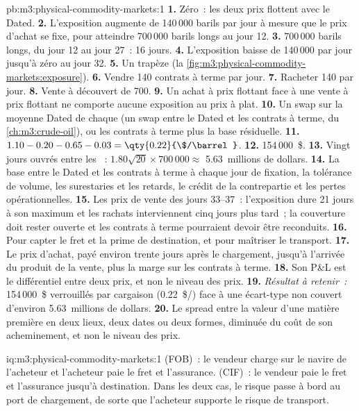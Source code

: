 \begin{solution}{pb:m3:physical-commodity-markets:1}
\textbf{1.} Zéro~: les deux prix flottent avec le Dated. \textbf{2.} L'exposition augmente de 140\,000
barils par jour à mesure que le prix d'achat se fixe, pour atteindre 700\,000 barils longs au jour 12. \textbf{3.}
700\,000 barils longs, du jour 12 au jour 27~: 16 jours. \textbf{4.} L'exposition baisse de
140\,000 par jour jusqu'à zéro au jour 32. \textbf{5.} Un trapèze
(la \cref{fig:m3:physical-commodity-markets:exposure}).
\textbf{6.} Vendre 140 contrats à terme par jour. \textbf{7.} Racheter 140 par jour.
\textbf{8.} Vente à découvert de 700. \textbf{9.} Un achat à prix flottant face à une vente à prix flottant ne
comporte aucune exposition au prix à plat. \textbf{10.} Un swap sur la moyenne Dated de chaque
 (un swap entre le Dated et les contrats à terme, du \cref{ch:m3:crude-oil}), ou les contrats à terme plus la
base résiduelle.
\textbf{11.} $1.10 - 0.20 - 0.65 - 0.03 = \qty{0.22}{\$/\barrel}$. \textbf{12.}
154\,000~\$. \textbf{13.} Vingt jours ouvrés entre les ~:
$1.80\sqrt{20} \times 700\,000 \approx$ 5.63~millions de dollars. \textbf{14.} La base
entre le Dated et les contrats à terme à chaque jour de fixation, la tolérance de volume, les surestaries et
les retards, le crédit de la contrepartie et les pertes opérationnelles. \textbf{15.} Les prix de vente
des jours 33--37~: l'exposition dure 21 jours à son maximum et les rachats interviennent cinq
jours plus tard~; la couverture doit rester ouverte et les contrats à terme pourraient devoir être reconduits.
\textbf{16.} Pour capter le fret et la prime de destination, et pour maîtriser le
transport. \textbf{17.} Le prix d'achat, payé environ trente jours après le chargement,
jusqu'à l'arrivée du produit de la vente, plus la marge sur les contrats à terme. \textbf{18.} Son P\&L
est le différentiel entre deux prix, et non le niveau des prix. \textbf{19.}
\emph{Résultat à retenir~:} 154\,000~\$ verrouillés par cargaison (\qty{0.22}{\$/\barrel}) face à une
écart-type non couvert d'environ 5.63~millions de dollars. \textbf{20.} Le spread
entre la valeur d'une matière première en deux lieux, deux dates ou deux formes, diminuée du coût de
son acheminement, et non le niveau des prix.
\end{solution}

\begin{solution}{iq:m3:physical-commodity-markets:1}
 (FOB)~: le vendeur charge sur le navire de l'acheteur et l'acheteur paie le fret et
l'assurance.  (CIF)~: le vendeur paie le fret et l'assurance jusqu'à destination. Dans les deux cas, le
risque passe à bord au port de chargement, de sorte que l'acheteur supporte le risque de transport.
\end{solution}

